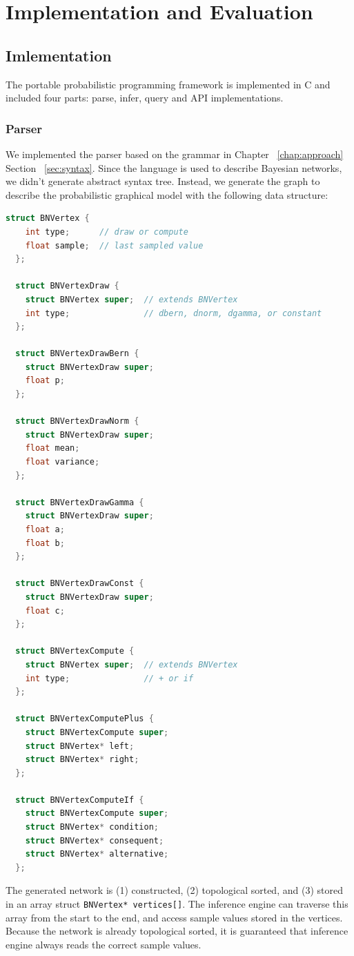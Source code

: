 \chapter{Implementation and Evaluation}
\label{chap:eval}
\section{Imlementation}
The portable probabilistic programming framework is implemented in C and included four parts: parse, infer, query and API implementations.

\subsection{Parser}
We implemented the parser based on the grammar in Chapter ~\ref{chap:approach} Section ~\ref{sec:syntax}. Since the language is used to describe Bayesian networks, we didn't generate abstract syntax tree. Instead, we generate the graph to describe the probabilistic graphical model with the following data structure:
\begin{lstlisting}[language=C]
  struct BNVertex {
    int type;      // draw or compute
    float sample;  // last sampled value
  };
 
  struct BNVertexDraw {
    struct BNVertex super;  // extends BNVertex
    int type;               // dbern, dnorm, dgamma, or constant
  };
 
  struct BNVertexDrawBern {
    struct BNVertexDraw super;
    float p;
  };
 
  struct BNVertexDrawNorm {
    struct BNVertexDraw super;
    float mean;
    float variance;
  };
 
  struct BNVertexDrawGamma {
    struct BNVertexDraw super;
    float a;
    float b;
  };
 
  struct BNVertexDrawConst {
    struct BNVertexDraw super;
    float c;
  };
 
  struct BNVertexCompute {
    struct BNVertex super;  // extends BNVertex
    int type;               // + or if
  };
 
  struct BNVertexComputePlus {
    struct BNVertexCompute super;
    struct BNVertex* left;
    struct BNVertex* right;
  };
 
  struct BNVertexComputeIf {
    struct BNVertexCompute super;
    struct BNVertex* condition;
    struct BNVertex* consequent;
    struct BNVertex* alternative;
  };
\end{lstlisting}
The generated network is (1) constructed, (2) topological sorted, and (3) stored in an array struct \texttt{BNVertex* vertices[]}. The inference engine can traverse this array from the start to the end, and access sample values stored in the vertices. Because the network is already topological sorted, it is guaranteed that inference engine always reads the correct sample values.

